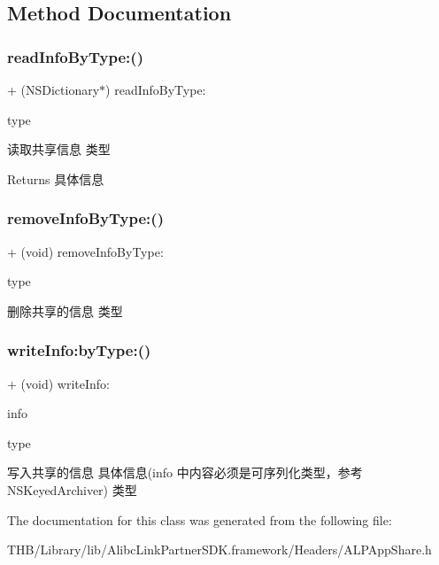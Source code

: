 \subsection{Method Documentation}
\mbox{\label{interface_a_l_p_app_share_a90323c186d7ccbaf97b24a2bf7f9729f}} 
\subsubsection{\texorpdfstring{read\+Info\+By\+Type\+:()}{readInfoByType:()}}
{\footnotesize\ttfamily + (N\+S\+Dictionary$\ast$) read\+Info\+By\+Type\+: \begin{DoxyParamCaption}\item[{(N\+S\+String $\ast$)}]{type }\end{DoxyParamCaption}}

读取共享信息  类型 \begin{DoxyReturn}{Returns}
具体信息 
\end{DoxyReturn}
\mbox{\label{interface_a_l_p_app_share_a9422f46b4191c59c4d4557a74ee083a7}} 
\subsubsection{\texorpdfstring{remove\+Info\+By\+Type\+:()}{removeInfoByType:()}}
{\footnotesize\ttfamily + (void) remove\+Info\+By\+Type\+: \begin{DoxyParamCaption}\item[{(N\+S\+String $\ast$)}]{type }\end{DoxyParamCaption}}

删除共享的信息  类型 \mbox{\label{interface_a_l_p_app_share_a055d75e9f6ae9aa950b321cf96681799}} 
\subsubsection{\texorpdfstring{write\+Info\+:by\+Type\+:()}{writeInfo:byType:()}}
{\footnotesize\ttfamily + (void) write\+Info\+: \begin{DoxyParamCaption}\item[{(N\+S\+Dictionary $\ast$)}]{info }\item[{byType:(N\+S\+String $\ast$)}]{type }\end{DoxyParamCaption}}

写入共享的信息  具体信息(info 中内容必须是可序列化类型，参考\+N\+S\+Keyed\+Archiver)  类型 

The documentation for this class was generated from the following file\+:\begin{DoxyCompactItemize}
\item 
T\+H\+B/\+Library/lib/\+Alibc\+Link\+Partner\+S\+D\+K.\+framework/\+Headers/A\+L\+P\+App\+Share.\+h\end{DoxyCompactItemize}

